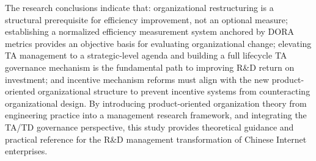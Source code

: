 \begin{abstract*}
  The research conclusions indicate that: organizational restructuring is a structural prerequisite for efficiency improvement, not an optional measure; establishing a normalized efficiency measurement system anchored by DORA metrics provides an objective basis for evaluating organizational change; elevating TA management to a strategic-level agenda and building a full lifecycle TA governance mechanism is the fundamental path to improving R\&D return on investment; and incentive mechanism reforms must align with the new product-oriented organizational structure to prevent incentive systems from counteracting organizational design. By introducing product-oriented organization theory from engineering practice into a management research framework, and integrating the TA/TD governance perspective, this study provides theoretical guidance and practical reference for the R\&D management transformation of Chinese Internet enterprises.

\end{abstract*}
